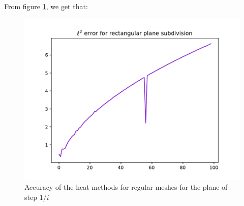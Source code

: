 \documentclass[math, info, english]{cours}
\begin{document}
From figure \ref{planediff}, we get that:
\begin{figure}[h]
	\centering
	\includegraphics{Figures/err_comp_planes_i<=100}
	\caption{Accuracy of the heat methods for regular meshes for the plane of step $1/i$}
	\label{planediff}
\end{figure}

\appendix


\end{document}

